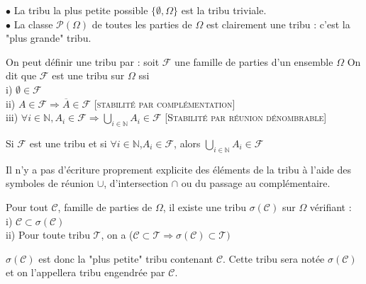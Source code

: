 \documentclass[landscape,twocolumn]{article}
\begin{document}
\begin{exe}[Tribus]
$\bullet$ La tribu la plus petite possible $ \{ \emptyset, \Omega \} $ est la tribu triviale. \\
$\bullet$ La classe $\mathcal{P}(\Omega)$ de toutes les parties de $\Omega$ est clairement une tribu : c'est la "plus grande" tribu.
\end{exe}

\begin{astu}[Tribu]
On peut définir une tribu par : soit $\mathcal{F}$ une famille de parties d'un ensemble $\Omega$ On dit que $\mathcal{F}$ est une tribu sur $\Omega$ ssi \\
  i) $\emptyset \in \mathcal{F}$ \\
 ii) $A \in \mathcal{F} \Longrightarrow \overline{A} \in \mathcal{F}$ {\small [\textsc {stabilité par complémentation}]} \\
iii) $\forall i \in \mathbb{N}, A_i \in \mathcal{F} \Longrightarrow \bigcup \limits_{i \in \mathbb{N}} A_i \in \mathcal{F}$ {\small [\textsc{Stabilité par réunion dénombrable}]}
\end{astu}

\begin{lemme}
Si $\mathcal{F}$ est une tribu et si $\forall i \in  \mathbb{N}$,$A_i \in \mathcal{F}$, alors $\bigcup \limits_{i \in \mathbb{N}} A_i \in \mathcal{F}$
\end{lemme}

\begin{att}
Il n'y a pas d'écriture proprement explicite des éléments de la tribu à l'aide des symboles de réunion $\cup$, d'intersection $\cap$ ou du passage au complémentaire.
\end{att}

\begin{theo}
Pour tout $\mathcal{C}$, famille de parties de $\Omega$, il existe une tribu $\sigma(\mathcal{C})$ sur $\Omega$ vérifiant : \\
i) $\mathcal{C} \subset \sigma(\mathcal{C})$ \\
ii) Pour toute tribu $\mathcal{T}$, on a ($\mathcal{C} \subset \mathcal{T} \Longrightarrow \sigma(\mathcal{C}) \subset \mathcal{T})$
\end{theo}

\begin{defin}
$\sigma(\mathcal{C})$ est donc la "plus petite" tribu contenant $\mathcal{C}$. Cette tribu sera notée $\sigma(\mathcal{C})$ et on l'appellera tribu engendrée par $\mathcal{C}$.
\end{defin}
\end{document}
